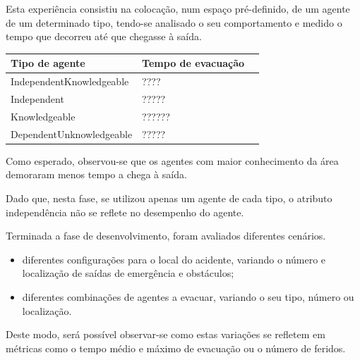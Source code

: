 \documentclass[12pt]{article}
\begin{document}
\begin{titlepage}
\begin{itemize}
Esta experiência consistiu na colocação, num espaço pré-definido, de um agente de um determinado tipo, tendo-se analisado o seu comportamento e medido o tempo que decorreu até que chegasse à saída.
	
\setlength{\tabcolsep}{20pt}
\renewcommand{\arraystretch}{1.3}
\begin{table}[H]
	\centering
	\begin{tabular}{@{}lll@{}}
		\toprule
		\rowcolor[HTML]{FFFFFF} 
		\textbf{Tipo de agente}  & \textbf{Tempo de evacuação}                                                                                                                                   \\ \toprule
		\rowcolor[HTML]{FFFFFF} 
		IndependentKnowledgeable &
		????\\ \midrule 
		\rowcolor[HTML]{FFFFFF} 
		Independent &
		?????\\ \midrule 
		Knowledgeable &
		??????\\ \midrule 
		DependentUnknowledgeable &
		?????\\ \midrule 
	\end{tabular}
\end{table}
	
	Como esperado, observou-se que os agentes com maior conhecimento da área demoraram menos tempo a chega à saída.
	
	Dado que, nesta fase, se utilizou apenas um agente de cada tipo, o atributo independência não se reflete no desempenho do agente.
	
	
\end{itemize}


Terminada a fase de desenvolvimento, foram avaliados diferentes cenários.
\begin{itemize}
	\item diferentes configurações para o local do acidente, variando o número e localização de saídas de emergência e obstáculos;
	\item diferentes combinações de agentes a evacuar, variando o seu tipo, número ou localização.
\end{itemize}

Deste modo, será possível observar-se como estas variações se refletem em métricas como o tempo médio e máximo de evacuação ou o número de feridos.


\end{titlepage}
\end{document}
